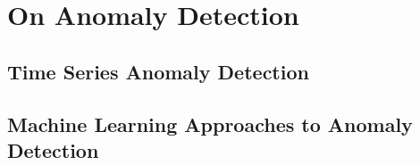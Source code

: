 \chapter{On Anomaly Detection}
\section{Time Series Anomaly Detection}
\section{Machine Learning Approaches to Anomaly Detection}